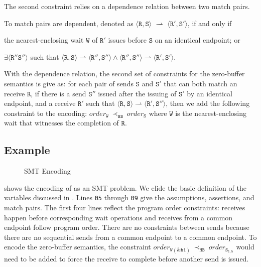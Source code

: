 The second constraint relies on a dependence relation between two match pairs.
\begin{definition}
To match pairs are dependent, denoted as $\langle\mathtt{R}, \mathtt{S}\rangle$ $\rightharpoonup$ $\langle\mathtt{R'}, \mathtt{S'}\rangle$, if and only if
\begin{compactenum}
\item the nearest-enclosing wait $\mathtt{W}$ of $\mathtt{R'}$ issues before $\mathtt{S}$ on an identical endpoint; or
\item $\exists\langle\mathtt{R''} \mathtt{S''}\rangle$ such that $\langle\mathtt{R}, \mathtt{S}\rangle \rightharpoonup \langle\mathtt{R''}, \mathtt{S''}\rangle\wedge\langle\mathtt{R''}, \mathtt{S''}\rangle \rightharpoonup \langle\mathtt{R'}, \mathtt{S'}\rangle$.
\end{compactenum}
\label{def:matchrelation}
\end{definition}
With the dependence relation, the second set of constraints for the zero-buffer semantics is give as: for each pair of sends $\mathtt{S}$ and $\mathtt{S'}$ that can both match an receive $\mathtt{R}$, if there is a send $\mathtt{S''}$ issued after the issuing of $\mathtt{S'}$ by an identical endpoint, and a receive $\mathtt{R'}$ such that $\langle\mathtt{R}, \mathtt{S}\rangle\rightharpoonup\langle\mathtt{R'}, \mathtt{S''}\rangle$, then we add the following constraint to the encoding: $\mathit{order}_{\mathtt{W}}\ \mathrm{\prec_{\mathtt{HB}}}\ \mathit{order}_{\mathtt{S}}$
where $\mathtt{W}$ is the nearest-enclosing wait that witnesses the
completion of $\mathtt{R}$.


\subsection{Example}

\begin{figure}[t]
\begin{center}
\usebox{\boxSMTc}
\end{center}
\caption{SMT Encoding} \label{fig:smt-encode}
\end{figure}

 shows the encoding of  as an
SMT problem. We elide the basic definition of the variables discussed
in . Lines \texttt{05} through \texttt{09} give
the assumptions, assertions, and match pairs. The first four lines
reflect the program order constraints: receives happen before
corresponding wait operations and receives from a common endpoint follow
program order. There are no constraints between sends because there are no sequential sends from a common endpoint to a common endpoint. To encode the zero-buffer semantics, the constraint
$\mathit{order}_\mathtt{W(\&h1)}\ \mathrm{\prec_\mathtt{HB}}\ \mathit{order}_\mathtt{S_{1,5}}$
would need to be added to force the receive to complete before another
send is issued.

